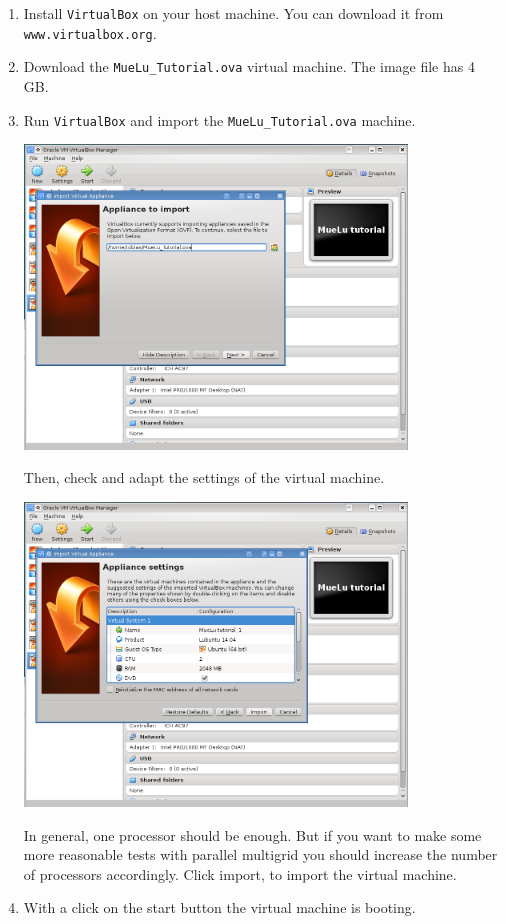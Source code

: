 \documentclass[10pt,fleqn]{book}
\begin{document}
\begin{enumerate}
\item Install \verb|VirtualBox| on your host machine. You can download it from \verb|www.virtualbox.org|.
\item Download the \verb|MueLu_Tutorial.ova| virtual machine. The image file has 4 GB.
\item Run \verb|VirtualBox| and import the \verb|MueLu_Tutorial.ova| machine.
\begin{center}\includegraphics[width=0.8\textwidth]{pics/installation_1.png} \end{center}
Then, check and adapt the settings of the virtual machine.
\begin{center}\includegraphics[width=0.8\textwidth]{pics/installation_2.png} \end{center}
In general, one processor should be enough. But if you want to make some more reasonable tests with parallel multigrid you should increase the number of processors accordingly.
Click import, to import the virtual machine.
\item With a click on the start button the virtual machine is booting.
\end{enumerate}
\end{document}
